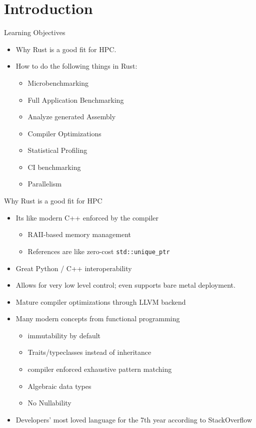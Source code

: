 \documentclass[compress,aspectratio=169]{beamer}
\begin{document}
\begin{frame}[plain]
	\titlepage
\end{frame}

\section{Introduction}

\begin{frame}{Learning Objectives}
  \begin{itemize}
    \item Why Rust is a good fit for HPC.
    \item How to do the following things in Rust:
      \begin{itemize}
        \item Microbenchmarking
        \item Full Application Benchmarking
        \item Analyze generated Assembly
        \item Compiler Optimizations
        \item Statistical Profiling
        \item CI benchmarking
        \item Parallelism
      \end{itemize}
  \end{itemize}
\end{frame}

\begin{frame}{Why Rust is a good fit for HPC}
  \begin{itemize}
      \pause
    \item Its like modern C++ enforced by the compiler
      \begin{itemize}
        \item RAII-based memory management
        \item References are like zero-cost \texttt{std::unique\_ptr}
      \end{itemize}
      \pause
    \item Great Python / C++ interoperability
      \pause
    \item Allows for very low level control; even supports bare metal deployment.
      \pause
    \item Mature compiler optimizations through LLVM backend
      \pause
    \item Many modern concepts from functional programming
      \begin{itemize}
        \item immutability by default
        \item Traits/typeclasses instead of inheritance
        \item compiler enforced exhaustive pattern matching
        \item Algebraic data types
        \item No Nullability
      \end{itemize}
      \pause
      \item Developers' most loved language for the 7th year according to StackOverflow \cite{sosurvey}
  \end{itemize}
\end{frame}
\end{document}
